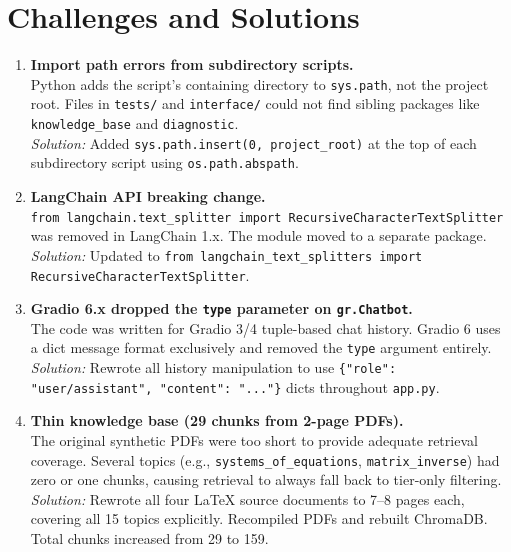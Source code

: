 \documentclass[11pt]{article}
\begin{document}
\section{Challenges and Solutions}

\begin{enumerate}[leftmargin=*, label=\textbf{\arabic*.}]

\item \textbf{Import path errors from subdirectory scripts.}\\
Python adds the script's containing directory to \texttt{sys.path}, not the project root. Files in \texttt{tests/} and \texttt{interface/} could not find sibling packages like \texttt{knowledge\_base} and \texttt{diagnostic}.\\
\textit{Solution:} Added \texttt{sys.path.insert(0, project\_root)} at the top of each subdirectory script using \texttt{os.path.abspath}.

\item \textbf{LangChain API breaking change.}\\
\texttt{from langchain.text\_splitter import RecursiveCharacterTextSplitter} was removed in LangChain 1.x. The module moved to a separate package.\\
\textit{Solution:} Updated to \texttt{from langchain\_text\_splitters import RecursiveCharacterTextSplitter}.

\item \textbf{Gradio 6.x dropped the \texttt{type} parameter on \texttt{gr.Chatbot}.}\\
The code was written for Gradio 3/4 tuple-based chat history. Gradio 6 uses a dict message format exclusively and removed the \texttt{type} argument entirely.\\
\textit{Solution:} Rewrote all history manipulation to use \texttt{\{"role": "user/assistant", "content": "..."\}} dicts throughout \texttt{app.py}.

\item \textbf{Thin knowledge base (29 chunks from 2-page PDFs).}\\
The original synthetic PDFs were too short to provide adequate retrieval coverage. Several topics (e.g., \texttt{systems\_of\_equations}, \texttt{matrix\_inverse}) had zero or one chunks, causing retrieval to always fall back to tier-only filtering.\\
\textit{Solution:} Rewrote all four \LaTeX{} source documents to 7--8 pages each, covering all 15 topics explicitly. Recompiled PDFs and rebuilt ChromaDB. Total chunks increased from 29 to 159.


\end{enumerate}
\end{document}
